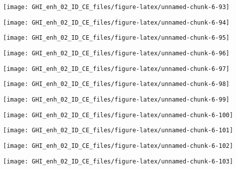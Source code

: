 \documentclass[
  10pt,
  a4paper,oneside]{article}
\begin{document}
\begin{center}\texttt{[image: GHI\_enh\_02\_ID\_CE\_files/figure-latex/unnamed-chunk-6-93]} \end{center}

\begin{center}\texttt{[image: GHI\_enh\_02\_ID\_CE\_files/figure-latex/unnamed-chunk-6-94]} \end{center}

\begin{center}\texttt{[image: GHI\_enh\_02\_ID\_CE\_files/figure-latex/unnamed-chunk-6-95]} \end{center}

\begin{center}\texttt{[image: GHI\_enh\_02\_ID\_CE\_files/figure-latex/unnamed-chunk-6-96]} \end{center}

\begin{center}\texttt{[image: GHI\_enh\_02\_ID\_CE\_files/figure-latex/unnamed-chunk-6-97]} \end{center}

\begin{center}\texttt{[image: GHI\_enh\_02\_ID\_CE\_files/figure-latex/unnamed-chunk-6-98]} \end{center}

\begin{center}\texttt{[image: GHI\_enh\_02\_ID\_CE\_files/figure-latex/unnamed-chunk-6-99]} \end{center}

\begin{center}\texttt{[image: GHI\_enh\_02\_ID\_CE\_files/figure-latex/unnamed-chunk-6-100]} \end{center}

\begin{center}\texttt{[image: GHI\_enh\_02\_ID\_CE\_files/figure-latex/unnamed-chunk-6-101]} \end{center}

\begin{center}\texttt{[image: GHI\_enh\_02\_ID\_CE\_files/figure-latex/unnamed-chunk-6-102]} \end{center}

\begin{center}\texttt{[image: GHI\_enh\_02\_ID\_CE\_files/figure-latex/unnamed-chunk-6-103]} \end{center}
\end{document}

